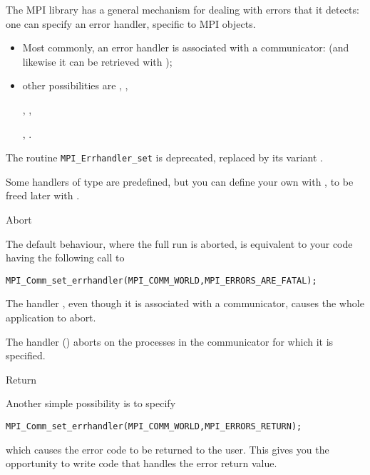 The MPI library has a general mechanism for dealing with errors that
it detects:
one can specify an error handler, specific to MPI objects.
\begin{itemize}
\item Most commonly, an error handler is associated with a communicator:
  (and likewise it can be retrieved with );
\item other possibilities are
  ,
  ,
\begin{mpifour}
  ,
  ,
\end{mpifour}
  ,
  .
\end{itemize}

\begin{remark}
  The routine
  \lstinline{MPI_Errhandler_set} is deprecated,
  replaced by its  variant  .
\end{remark}

Some handlers of type  are predefined,
but you can define your own with
,
to be freed later with
.

 {Abort}

The default behaviour, where the full run is aborted, is
equivalent to your code having the following
call to 
\begin{lstlisting}
MPI_Comm_set_errhandler(MPI_COMM_WORLD,MPI_ERRORS_ARE_FATAL);
\end{lstlisting}

The handler , even though it is
associated with a communicator, causes the whole application to abort.

\begin{mpifour}
  The handler  ()
  aborts on the processes in the communicator for which it is specified.
\end{mpifour}

 {Return}

Another simple possibility is to specify
\begin{lstlisting}
MPI_Comm_set_errhandler(MPI_COMM_WORLD,MPI_ERRORS_RETURN);
\end{lstlisting}
which causes the error code to be returned to the user.
This gives you the opportunity to write code that handles the error
return value. 

